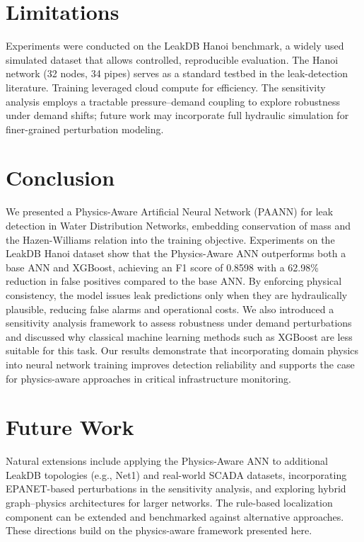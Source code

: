 \documentclass[final,5p,times,twocolumn,authoryear]{elsarticle}
\begin{document}
\section{Limitations}
Experiments were conducted on the LeakDB Hanoi benchmark, a widely used simulated dataset that allows controlled, reproducible evaluation. The Hanoi network (32 nodes, 34 pipes) serves as a standard testbed in the leak-detection literature. Training leveraged cloud compute for efficiency. The sensitivity analysis employs a tractable pressure–demand coupling to explore robustness under demand shifts; future work may incorporate full hydraulic simulation for finer-grained perturbation modeling.

\section{Conclusion}

We presented a Physics-Aware Artificial Neural Network (PAANN) for leak detection in Water Distribution Networks, embedding conservation of mass and the Hazen-Williams relation into the training objective. Experiments on the LeakDB Hanoi dataset show that the Physics-Aware ANN outperforms both a base ANN and XGBoost, achieving an F1 score of 0.8598 with a 62.98\% reduction in false positives compared to the base ANN. By enforcing physical consistency, the model issues leak predictions only when they are hydraulically plausible, reducing false alarms and operational costs. We also introduced a sensitivity analysis framework to assess robustness under demand perturbations and discussed why classical machine learning methods such as XGBoost are less suitable for this task. Our results demonstrate that incorporating domain physics into neural network training improves detection reliability and supports the case for physics-aware approaches in critical infrastructure monitoring.

\section{Future Work}

Natural extensions include applying the Physics-Aware ANN to additional LeakDB topologies (e.g., Net1) and real-world SCADA datasets, incorporating EPANET-based perturbations in the sensitivity analysis, and exploring hybrid graph–physics architectures for larger networks. The rule-based localization component can be extended and benchmarked against alternative approaches. These directions build on the physics-aware framework presented here.
\end{document}
